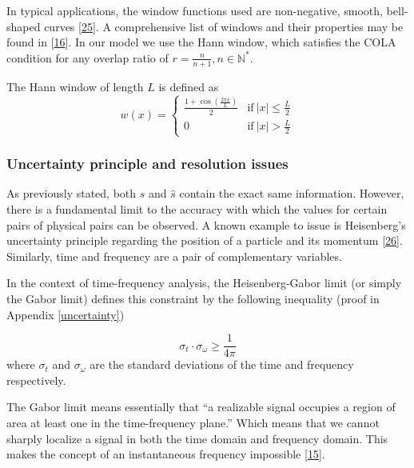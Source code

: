 \documentclass[
  american,
]{article}
\begin{document}
In typical applications, the window functions used are non-negative,
smooth, bell-shaped curves {[}\protect\hyperlink{ref-roads2002}{25}{]}.
A comprehensive list of windows and their properties may be found in {[}\protect\hyperlink{ref-heinzel2002}{16}{]}.
In our model we use the Hann window, which satisfies the COLA condition
for any overlap ratio of \(r=\frac{n}{n+1},n\in\mathbb{N}^*\).

The Hann window of length \(L\) is defined as
\begin{equation}
w(x)=\begin{cases}
\frac{1+\cos\left(\frac{2\pi x}{L}\right)}{2} & \text{if}~\left\lvert x\right\rvert\leq\frac{L}{2}\\
0 & \text{if}~\left\lvert x\right\rvert>\frac{L}{2}
\end{cases}
\end{equation}

\hypertarget{uncertainty-principle-and-resolution-issues}{%
\subsubsection{Uncertainty principle and resolution issues}\label{uncertainty-principle-and-resolution-issues}}

As previously stated, both \(s\) and \(\hat s\) contain the exact same information.
However, there is a fundamental limit to the accuracy with which the values
for certain pairs of physical pairs can be observed.
A known example to issue is Heisenberg's uncertainty principle regarding
the position of a particle and its momentum {[}\protect\hyperlink{ref-sen2014}{26}{]}.
Similarly, time and frequency are a pair of complementary variables.

In the context of time-frequency analysis, the Heisenberg-Gabor limit
(or simply the Gabor limit) defines this constraint by the following inequality
(proof in Appendix \ref{uncertainty})

\begin{equation}
\sigma_t\cdot\sigma_\omega\geq \frac{1}{4\pi}
\end{equation}
where \(\sigma_t\) and \(\sigma_\omega\) are the standard deviations of the time and frequency respectively.

The Gabor limit means essentially that
``a realizable signal occupies a region of area at least one in the time-frequency plane.''
Which means that we cannot sharply localize a signal in both the time domain and frequency domain.
This makes the concept of an instantaneous frequency impossible {[}\protect\hyperlink{ref-grochenig2001}{15}{]}.
\end{document}
